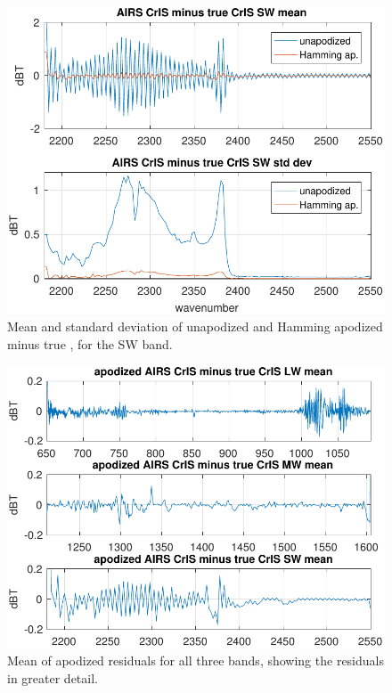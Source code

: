 \documentclass[10pt,twocolumn]{article}
\begin{document}
\begin{figure} %
  \centering
  \includegraphics[width=\linewidth]{figures/a2cris_diff_SW.pdf}
  \caption{Mean and standard deviation of unapodized and Hamming
    apodized {\airs} {\cris} minus true {\cris}, for the {\cris} SW
    band.}
  \label{diffSW}
\end{figure}

\begin{figure} %
  \centering
  \includegraphics[width=\linewidth]{figures/a2cris_diff_all.pdf}
  \caption{Mean of apodized residuals for all three {\cris} bands,
    showing the residuals in greater detail.}
  \label{meanAll}
\end{figure}
\end{document}
